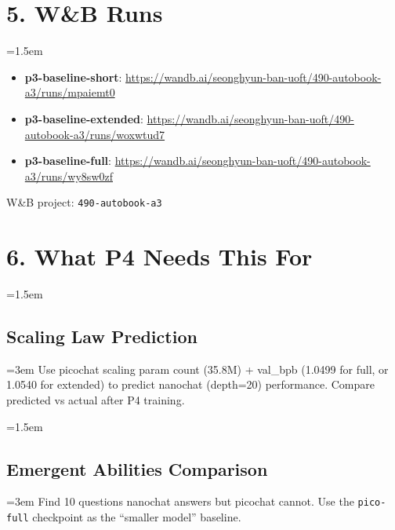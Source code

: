 \documentclass[9pt]{extarticle}
\begin{document}
\leftskip=0pt
\section*{5. W\&B Runs}
\leftskip=1.5em

\begin{itemize}
  \item \textbf{p3-baseline-short}: \url{https://wandb.ai/seonghyun-ban-uoft/490-autobook-a3/runs/mpaiemt0}
  \item \textbf{p3-baseline-extended}: \url{https://wandb.ai/seonghyun-ban-uoft/490-autobook-a3/runs/woxwtud7}
  \item \textbf{p3-baseline-full}: \url{https://wandb.ai/seonghyun-ban-uoft/490-autobook-a3/runs/wy8sw0zf}
\end{itemize}

W\&B project: \texttt{490-autobook-a3}

\leftskip=0pt
\section*{6. What P4 Needs This For}
\leftskip=1.5em

\subsection*{Scaling Law Prediction}
\leftskip=3em
Use picochat scaling param count (35.8M) + val\_bpb (1.0499 for full, or 1.0540 for extended) to predict nanochat (depth=20) performance. Compare predicted vs actual after P4 training.

\leftskip=1.5em
\subsection*{Emergent Abilities Comparison}
\leftskip=3em
Find 10 questions nanochat answers but picochat cannot. Use the \texttt{pico-full} checkpoint as the ``smaller model'' baseline.
\end{document}
